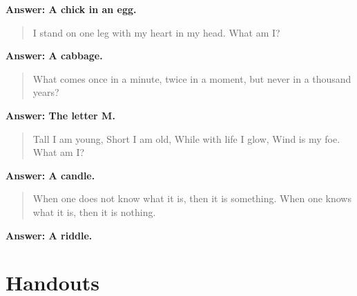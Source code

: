 \begin{multicols}{2}
\textbf{Answer: A chick in an egg.}

\begin{quotation}
I stand on one leg with my heart in my head.
What am I?
\end{quotation}

\textbf{Answer: A cabbage.}

\begin{quotation}
What comes once in a minute, twice in a moment, but never in a thousand years?
\end{quotation}

\textbf{Answer: The letter M.}

\begin{quotation}
Tall I am young, Short I am old, While with life I glow, Wind is my foe. What am I?
\end{quotation}

\textbf{Answer: A candle.}

\begin{quotation}
When one does not know what it is, then it is something. When one knows what it is, then it is nothing.
\end{quotation}

\textbf{Answer: A riddle.}

\end{multicols}

\chapter{Handouts}

